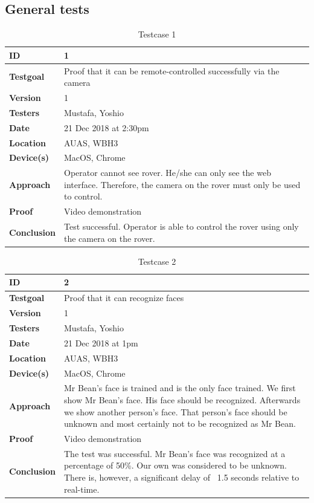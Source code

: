 \documentclass[12pt]{article}
\begin{document}
 	\subsection{General tests}
 	\begin{table}[H]
 		\centering
 		\begin{tabularx}{\linewidth}{|X|X|}
 			\hline
 			\textbf{ID} &1\\
 			\hline
 			\textbf{Testgoal} &Proof that it can be remote-controlled successfully via the camera\\
 			\hline
 			\textbf{Version} &1\\
 			\hline
 			\textbf{Testers} &Mustafa, Yoshio\\
 			\hline
 			\textbf{Date} &21 Dec 2018 at 2:30pm\\
 			\hline
 			\textbf{Location} &AUAS, WBH3\\
 			\hline
 			\textbf{Device(s)} &MacOS, Chrome\\
 			\hline
 			\textbf{Approach} &Operator cannot see rover. He/she can only see the web interface. 	Therefore, the camera on the rover must only be used to control.\\
 			\hline
 			\textbf{Proof} &Video demonstration\\
 			\hline
 			\textbf{Conclusion} &Test successful. Operator is able to control the rover using only the camera on the rover.\\
 			\hline
 		\end{tabularx}
 		\caption{Testcase 1}
 		\label{table:Testcase 1}   
 	\end{table}
	 \begin{table}[H]
	 	\centering
	 	\begin{tabularx}{\linewidth}{|X|X|}
	 		\hline
	 		\textbf{ID} &2\\
	 		\hline
	 		\textbf{Testgoal} &Proof that it can recognize faces\\
	 		\hline
	 		\textbf{Version} &1\\
	 		\hline
	 		\textbf{Testers} &Mustafa, Yoshio\\
	 		\hline
	 		\textbf{Date} &21 Dec 2018 at 1pm\\
	 		\hline
	 		\textbf{Location} &AUAS, WBH3\\
	 		\hline
	 		\textbf{Device(s)} &MacOS, Chrome\\
	 		\hline
	 		\textbf{Approach} &Mr Bean's face is trained and is the only face trained. We first show Mr Bean's face. His face should be recognized. Afterwards we show another person's face. That person's face should be unknown and most certainly not to be recognized as Mr Bean.\\
	 		\hline
	 		\textbf{Proof} &Video demonstration\\
	 		\hline
	 		\textbf{Conclusion} &The test was successful. Mr Bean's face was recognized at a percentage of 50\%. Our own was considered to be unknown. There is, however, a significant delay of ~1.5 seconds relative to real-time.\\
	 		\hline
	 	\end{tabularx}
	 	\caption{Testcase 2}
	 	\label{table:Testcase 2}   
	 \end{table}
\end{document}
